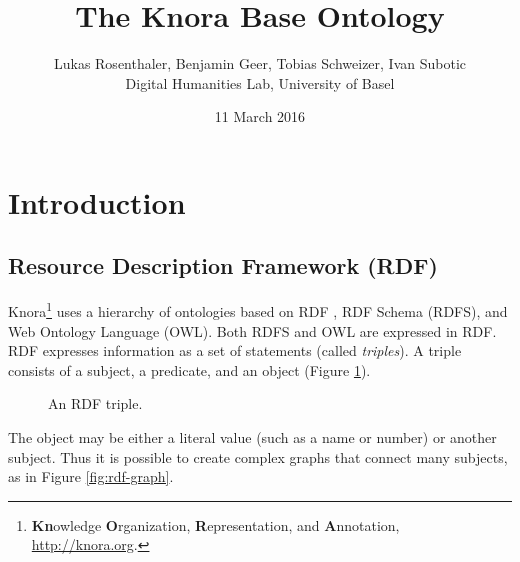 \documentclass[12pt, a4paper]{article}
\title{The Knora Base Ontology}
\author{Lukas Rosenthaler, Benjamin Geer, Tobias Schweizer, Ivan Subotic\\Digital Humanities Lab, University of Basel}
\date{11 March 2016}
\begin{document}
\maketitle

\listoftodos

\tableofcontents

\section{Introduction}

\subsection{Resource Description Framework (RDF)}
Knora\footnote{{\bf Kn}owledge {\bf O}rganization, {\bf R}epresentation, and {\bf A}nnotation, \url{http://knora.org}.} uses a hierarchy of ontologies based on RDF \cite{RDF_Primer_1_1}, RDF Schema (RDFS)\cite{RDF_Schema_1_1}, and Web Ontology Language (OWL)\cite{OWL_2_Primer}. Both RDFS and OWL are expressed in RDF. RDF expresses information as a set of statements (called {\em triples}). A triple consists of a subject, a predicate, and an object (Figure \ref{fig:rdf-triple}).

\begin{figure}[h]
\centering
{}
\caption{An RDF triple.}
\label{fig:rdf-triple}
\end{figure}

The object may be either a literal value (such as a name or number) or another subject. Thus it is possible to create complex graphs that connect many subjects, as in Figure \ref{fig:rdf-graph}.
\end{document}
